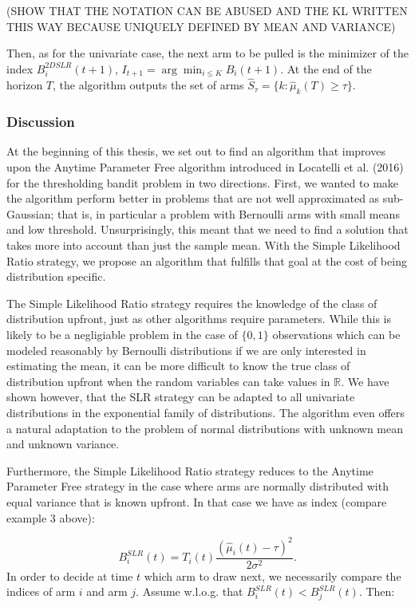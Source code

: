 \documentclass[12pt,]{article}
\begin{document}
(SHOW THAT THE NOTATION CAN BE ABUSED AND THE KL WRITTEN THIS WAY
BECAUSE UNIQUELY DEFINED BY MEAN AND VARIANCE)

Then, as for the univariate case, the next arm to be pulled is the
minimizer of the index \(B_i^{2DSLR}(t+1)\),
\(I_{t+1} = \arg \min_{i\leq K} B_i(t+1)\). At the end of the horizon
\(T\), the algorithm outputs the set of arms
\(\hat{S}_\tau = \{k: \hat{\mu}_k(T) \geq \tau\}\).

\subsubsection{Discussion}\label{discussion-1}

At the beginning of this thesis, we set out to find an algorithm that
improves upon the Anytime Parameter Free algorithm introduced in
Locatelli et al. (2016) for the thresholding bandit problem in two
directions. First, we wanted to make the algorithm perform better in
problems that are not well approximated as sub-Gaussian; that is, in
particular a problem with Bernoulli arms with small means and low
threshold. Unsurprisingly, this meant that we need to find a solution
that takes more into account than just the sample mean. With the Simple
Likelihood Ratio strategy, we propose an algorithm that fulfills that
goal at the cost of being distribution specific.

The Simple Likelihood Ratio strategy requires the knowledge of the class
of distribution upfront, just as other algorithms require parameters.
While this is likely to be a negligiable problem in the case of
\(\{0,1\}\) observations which can be modeled reasonably by Bernoulli
distributions if we are only interested in estimating the mean, it can
be more difficult to know the true class of distribution upfront when
the random variables can take values in \(\mathbb{R}\). We have shown
however, that the SLR strategy can be adapted to all univariate
distributions in the exponential family of distributions. The algorithm
even offers a natural adaptation to the problem of normal distributions
with unknown mean and unknown variance.

Furthermore, the Simple Likelihood Ratio strategy reduces to the Anytime
Parameter Free strategy in the case where arms are normally distributed
with equal variance that is known upfront. In that case we have as index
(compare example 3 above):

\[
B_i^{SLR}(t) = T_i(t)\frac{(\hat{\mu}_i(t) - \tau)^2}{2\sigma^2}.
\] In order to decide at time \(t\) which arm to draw next, we
necessarily compare the indices of arm \(i\) and arm \(j\). Assume
w.l.o.g. that \(B_i^{SLR}(t) < B_j^{SLR}(t)\). Then:
\end{document}
